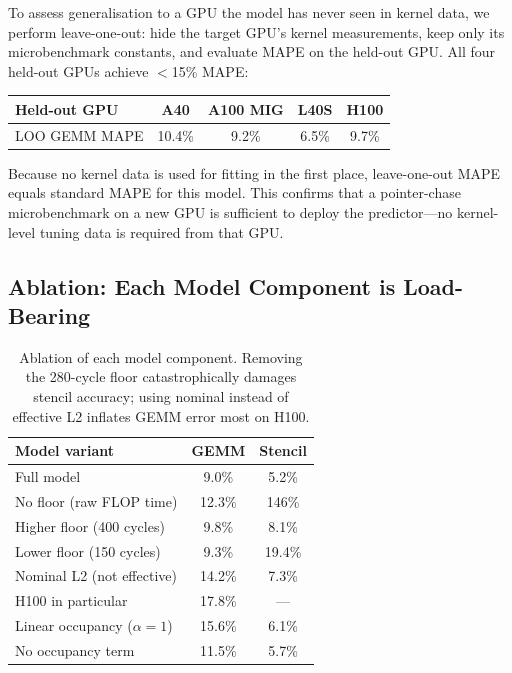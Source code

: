 \documentclass[10pt,twocolumn]{article}
\begin{document}
To assess generalisation to a GPU the model has never seen in
kernel data, we perform leave-one-out: hide the target GPU's
kernel measurements, keep only its microbenchmark constants, and
evaluate MAPE on the held-out GPU.  All four held-out GPUs achieve
$<$15\% MAPE:

\begin{center}
\small
\renewcommand{\arraystretch}{1.2}
\begin{tabular}{@{}lcccc@{}}
\toprule
Held-out GPU & A40 & A100 MIG & L40S & H100 \\
\midrule
LOO GEMM MAPE & 10.4\% & 9.2\% & 6.5\% & 9.7\% \\
\bottomrule
\end{tabular}
\end{center}

Because no kernel data is used for fitting in the first place,
leave-one-out MAPE equals standard MAPE for this model.  This
confirms that a pointer-chase microbenchmark on a new GPU is
sufficient to deploy the predictor---no kernel-level tuning data is
required from that GPU.

\subsection{Ablation: Each Model Component is Load-Bearing}
\label{sec:ablation}

\begin{table}[h]
\centering
\footnotesize
\caption{Ablation of each model component.  Removing the 280-cycle
floor catastrophically damages stencil accuracy; using nominal
instead of effective L2 inflates GEMM error most on H100.}
\label{tab:ablation}
\renewcommand{\arraystretch}{1.15}
\begin{tabular}{@{}lcc@{}}
\toprule
\textbf{Model variant} & \textbf{GEMM} & \textbf{Stencil} \\
\midrule
Full model                      &  9.0\% &   5.2\% \\
\midrule
No floor (raw FLOP time)        & 12.3\% & 146\% \\
Higher floor (400 cycles)       &  9.8\% &   8.1\% \\
Lower floor (150 cycles)        &  9.3\% &  19.4\% \\
\midrule
Nominal L2 (not effective)      & 14.2\% &   7.3\% \\
\quad H100 in particular        & 17.8\% & --- \\
\midrule
Linear occupancy ($\alpha{=}1$) & 15.6\% &   6.1\% \\
No occupancy term               & 11.5\% &   5.7\% \\
\bottomrule
\end{tabular}
\end{table}
\end{document}
